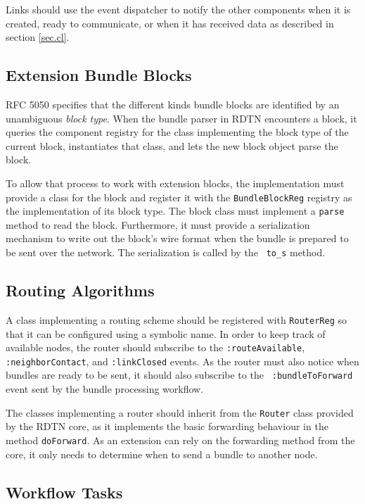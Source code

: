 \documentclass[a4paper]{article}
\begin{document}
Links should use the event dispatcher to notify the other components when it is
created, ready to communicate, or when it has received data as described in
section \ref{sec.cl}.

\subsection{Extension Bundle Blocks}\label{sec.ext.blocks}

RFC 5050 \cite{bundle-spec} specifies that the different kinds bundle blocks are
identified by an unambiguous {\em block type}. When the bundle parser in RDTN
encounters a block, it queries the component registry for the class implementing
the block type of the current block, instantiates that class, and lets the new
block object parse the block.

To allow that process to work with extension blocks, the implementation must
provide a class for the block and register it with the {\tt BundleBlockReg}
registry as the implementation of its block type. The block class must implement
a {\tt parse} method to read the block. Furthermore, it must provide a
serialization mechanism to write out the block's wire format when the bundle is
prepared to be sent over the network. The serialization is called by the {\tt
to\_s} method.

\subsection{Routing Algorithms}\label{sec.ext.routing}

A class implementing a routing scheme should be registered with {\tt RouterReg}
so that it can be configured using a symbolic name. In order to keep track of
available nodes, the router should subscribe to the {\tt :routeAvailable}, {\tt
:neighborContact}, and {\tt :linkClosed} events. As the router must also notice
when bundles are ready to be sent, it should also subscribe to the {\tt
:bundleToForward} event sent by the bundle processing workflow.

The classes implementing a router should inherit from the {\tt Router} class
provided by the RDTN core, as it implements the basic forwarding behaviour in
the method {\tt doForward}.  As an extension can rely on the forwarding method
from the core, it only needs to determine when to send a bundle to another node.

\subsection{Workflow Tasks}\label{sec.ext.workflow}
\end{document}
